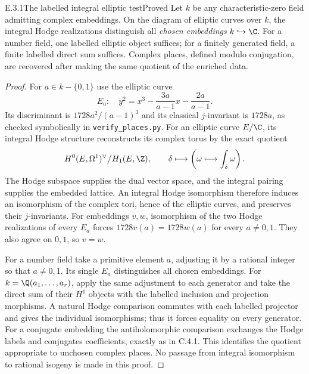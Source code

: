 \begin{result}{E.3.1}{The labelled integral elliptic test}{Proved}
Let $k$ be any characteristic-zero field admitting complex embeddings. On the diagram of elliptic curves over $k$, the integral Hodge realizations distinguish all \emph{chosen embeddings} $k\hookrightarrow\C$. For a number field, one labelled elliptic object suffices; for a finitely generated field, a finite labelled direct sum suffices. Complex places, defined modulo conjugation, are recovered after making the same quotient of the enriched data.
\end{result}
\begin{proof}
For $a\in k-\{0,1\}$ use the elliptic curve
\[
 E_a:\quad y^2=x^3-\frac{3a}{a-1}x-\frac{2a}{a-1}.
\]
Its discriminant is $1728a^2/(a-1)^3$ and its classical $j$-invariant is $1728a$, as checked symbolically in \texttt{verify\_places.py}. For an elliptic curve $E/\C$, its integral Hodge structure reconstructs its complex torus by the exact quotient
\[
 H^0(E,\Omega^1)^\vee\big/H_1(E,\Z),
 \qquad
 \delta\longmapsto\left(\omega\longmapsto\int_\delta\omega\right).
\]
The Hodge subspace supplies the dual vector space, and the integral pairing supplies the embedded lattice. An integral Hodge isomorphism therefore induces an isomorphism of the complex tori, hence of the elliptic curves, and preserves their $j$-invariants. For embeddings $v,w$, isomorphism of the two Hodge realizations of every $E_a$ forces $1728v(a)=1728w(a)$ for every $a\ne0,1$. They also agree on $0,1$, so $v=w$.

For a number field take a primitive element $a$, adjusting it by a rational integer so that $a\ne0,1$. Its single $E_a$ distinguishes all chosen embeddings. For $k=\Q(a_1,\ldots,a_r)$, apply the same adjustment to each generator and take the direct sum of their $H^1$ objects with the labelled inclusion and projection morphisms. A natural Hodge comparison commutes with each labelled projector and gives the individual isomorphisms; thus it forces equality on every generator. For a conjugate embedding the antiholomorphic comparison exchanges the Hodge labels and conjugates coefficients, exactly as in C.4.1. This identifies the quotient appropriate to unchosen complex places. No passage from integral isomorphism to rational isogeny is made in this proof.
\end{proof}

